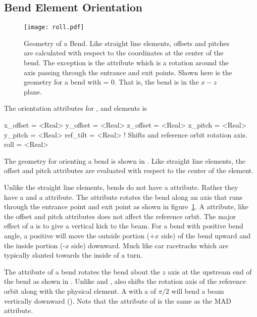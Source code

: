 \subsection{Bend Element Orientation}
\label{s:bend.orient}

\begin{figure}[ht]
  \centering
  \texttt{[image: roll.pdf]}
  \caption[Geometry of a Bend]{
Geometry of a Bend. Like straight line elements, offsets and pitches are calculated with respect to
the coordinates at the center of the bend. The exception is the  attribute which is a
rotation around the axis passing through the entrance and exit points.  Shown here is the geometry
for a bend with  = 0. That is, the bend is in the $x-z$ plane.}
  \label{f:roll}
\end{figure}

The orientation attributes for ,  and  elements is
\begin{example}
  x_offset = <Real>
  y_offset = <Real>
  z_offset = <Real>
  x_pitch  = <Real>
  y_pitch  = <Real>
  ref_tilt = <Real>    ! Shifts and reference orbit rotation axis.
  roll     = <Real>    
\end{example}
The geometry for orienting a bend is shown in . Like straight line elements, the offset
and pitch attributes are evaluated with respect to the center of the element.

Unlike the straight line elements, bends do not have a  attribute. Rather they have a
 and a  attribute.  The  attribute rotates the bend along an axis
that runs through the entrance point and exit point as shown in figure~\ref{f:roll}. A 
attribute, like the offset and pitch attributes does not affect the reference orbit.  The major
effect of a  is to give a vertical kick to the beam. For a bend with positive bend angle, a
positive  will move the outside portion ($+x$ side) of the bend upward and the inside
portion (-$x$ side) downward. Much like car racetracks which are typically slanted towards the
inside of a turn.

The  attribute of a bend rotates the bend about the $z$ axis at the upstream end of the
bend as shown in . Unlike  and ,  also shifts the
rotation axis of the reference orbit along with the physical element. A  with a
 of $\pi/2$ will bend a beam vertically downward (). Note that the
 attribute of \bmad is the same as the MAD  attribute.

